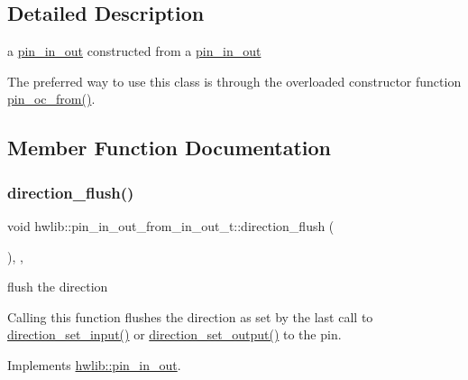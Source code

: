\subsection{Detailed Description}
a \hyperlink{classhwlib_1_1pin__in__out}{pin\+\_\+in\+\_\+out} constructed from a \hyperlink{classhwlib_1_1pin__in__out}{pin\+\_\+in\+\_\+out}

The preferred way to use this class is through the overloaded constructor function \hyperlink{namespacehwlib_aa2c63efcb24f3d5124567356d8c8a804}{pin\+\_\+oc\+\_\+from()}. 

\subsection{Member Function Documentation}
\mbox{\label{classhwlib_1_1pin__in__out__from__in__out__t_a68d7cb2826dbd2d36d4641e0b1d91c81}} 
\subsubsection{\texorpdfstring{direction\+\_\+flush()}{direction\_flush()}}
{\footnotesize\ttfamily void hwlib\+::pin\+\_\+in\+\_\+out\+\_\+from\+\_\+in\+\_\+out\+\_\+t\+::direction\+\_\+flush (\begin{DoxyParamCaption}{ }\end{DoxyParamCaption})\hspace{0.3cm}{\ttfamily [inline]}, {\ttfamily [override]}, {\ttfamily [virtual]}}

flush the direction

Calling this function flushes the direction as set by the last call to \hyperlink{classhwlib_1_1pin__in__out__from__in__out__t_a0b0a260c43a6f1162fd5bc6bbffeaa15}{direction\+\_\+set\+\_\+input()} or \hyperlink{classhwlib_1_1pin__in__out__from__in__out__t_a6c0f6e7f37e52cc1d6fec7932a024cb1}{direction\+\_\+set\+\_\+output()} to the pin. 

Implements \hyperlink{classhwlib_1_1pin__in__out_a86ef2b296683d8c0133280075c82cb51}{hwlib\+::pin\+\_\+in\+\_\+out}.

\mbox{\label{classhwlib_1_1pin__in__out__from__in__out__t_a0b0a260c43a6f1162fd5bc6bbffeaa15}} 
